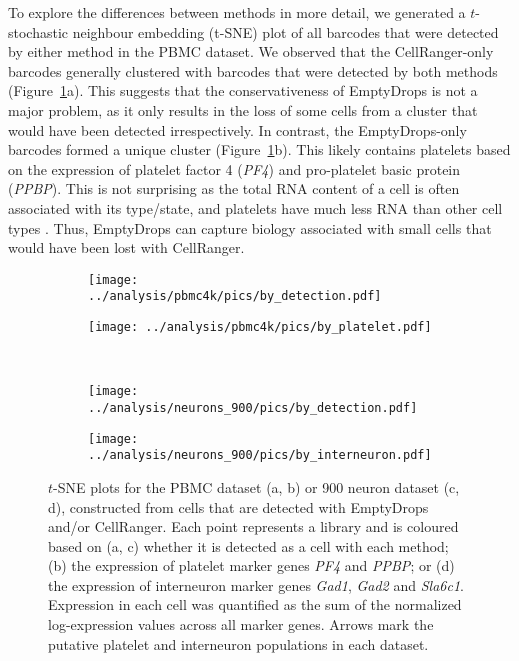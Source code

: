 \documentclass[10pt,letterpaper]{article}
\begin{document}
To explore the differences between methods in more detail, we generated a $t$-stochastic neighbour embedding (t-SNE) plot \cite{van2008visualizing} of all barcodes that were detected by either method in the PBMC dataset.
We observed that the CellRanger-only barcodes generally clustered with barcodes that were detected by both methods (Figure~\ref{fig:realtsne}a).
This suggests that the conservativeness of EmptyDrops is not a major problem, as it only results in the loss of some cells from a cluster that would have been detected irrespectively.
In contrast, the EmptyDrops-only barcodes formed a unique cluster (Figure~\ref{fig:realtsne}b). 
This likely contains platelets based on the expression of platelet factor 4 (\textit{PF4}) and pro-platelet basic protein (\textit{PPBP}).
This is not surprising as the total RNA content of a cell is often associated with its type/state, and platelets have much less RNA than other cell types \cite{rowley2012platelet}.
Thus, EmptyDrops can capture biology associated with small cells that would have been lost with CellRanger.

\begin{figure}[btp]
    \begin{subfigure}{0.49\textwidth}
        \texttt{[image: ../analysis/pbmc4k/pics/by\_detection.pdf]}
        \caption{}
    \end{subfigure}
    \begin{subfigure}{0.49\textwidth}
        \texttt{[image: ../analysis/pbmc4k/pics/by\_platelet.pdf]}
        \caption{}
    \end{subfigure} \\[0.05in]
    \begin{subfigure}{0.49\textwidth}
        \texttt{[image: ../analysis/neurons\_900/pics/by\_detection.pdf]}
        \caption{}
    \end{subfigure}
    \begin{subfigure}{0.49\textwidth}
        \texttt{[image: ../analysis/neurons\_900/pics/by\_interneuron.pdf]}
        \caption{}
    \end{subfigure} 
    \caption{$t$-SNE plots for the PBMC dataset (a, b) or 900 neuron dataset (c, d), constructed from cells that are detected with EmptyDrops and/or CellRanger.
        Each point represents a library and is coloured based on (a, c) whether it is detected as a cell with each method;
        (b) the expression of platelet marker genes \textit{PF4} and \textit{PPBP};
        or (d) the expression of interneuron marker genes \textit{Gad1}, \textit{Gad2} and \textit{Sla6c1}.
        Expression in each cell was quantified as the sum of the normalized log-expression values across all marker genes.
        Arrows mark the putative platelet and interneuron populations in each dataset.
    }
    \label{fig:realtsne}
\end{figure}
\end{document}

